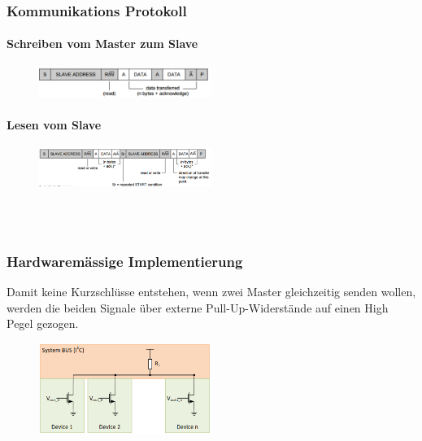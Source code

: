 \begin{multicols}{2}
    \subsubsection{Kommunikations Protokoll}
    \paragraph{Schreiben vom Master zum Slave}
    \begin{figure}[H]
        \includegraphics[width=0.5\textwidth]{images/i2c_protocol1.png}
    \end{figure}
    
    \paragraph{Lesen vom Slave}
    \begin{figure}[H]
        \includegraphics[width=0.5\textwidth]{images/i2c_protocol2.png}
    \end{figure}
    
    \ \\ \ \\
    
    \subsubsection{Hardwaremässige Implementierung}
    Damit keine Kurzschlüsse entstehen, wenn zwei Master gleichzeitig senden wollen, werden die beiden Signale über externe Pull-Up-Widerstände auf einen High Pegel gezogen.
    \begin{figure}[H]
        \includegraphics[width=0.5\textwidth]{images/i2c_hardware.png}
    \end{figure}
\end{multicols}

